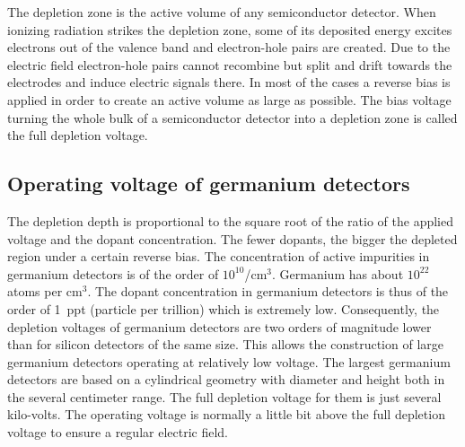The depletion zone is the active volume of any semiconductor detector. When ionizing radiation strikes the depletion zone, some of its deposited energy excites electrons out of the valence band and electron-hole pairs are created. Due to the electric field electron-hole pairs cannot recombine but split and drift towards the electrodes and induce electric signals there. In most of the cases a reverse bias is applied in order to create an active volume as large as possible. The bias voltage turning the whole bulk of a semiconductor detector into a depletion zone is called the full depletion voltage.

\subsection{Operating voltage of germanium detectors}
\label{sec:det:volt}
The depletion depth is proportional to the square root of the ratio of the applied voltage and the dopant concentration. The fewer dopants, the bigger the depleted region under a certain reverse bias. The concentration of active impurities in germanium detectors is of the order of $10^{10}$/cm$^{3}$. Germanium has about $10^{22}$ atoms per cm$^{3}$. The dopant concentration in germanium detectors is thus of the order of 1~ppt (particle per trillion) which is extremely low. Consequently, the depletion voltages of germanium detectors are two orders of magnitude lower than for silicon detectors of the same size. This allows the construction of large germanium detectors operating at relatively low voltage. The largest germanium detectors are based on a cylindrical geometry with diameter and height both in the several centimeter range. The full depletion voltage for them is just several kilo-volts. The operating voltage is normally a little bit above the full depletion voltage to ensure a regular electric field.

